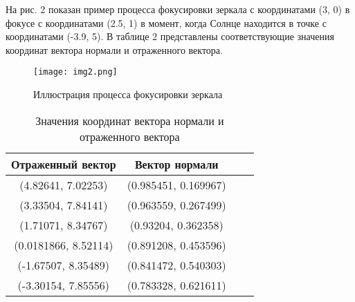 \documentclass{report}
\begin{document}
\begin{verbatim}
\end{verbatim}

На рис. 2 показан пример процесса фокусировки зеркала с координатами (3, 0) в фокусе с координатами (2.5, 1) в момент, когда Солнце находится в точке с координатами (-3.9, 5). В таблице 2 представлены соответствующие значения координат вектора нормали и отраженного вектора.

\begin{figure}[!htb]
     \centering
     \texttt{[image: img2.png]}
     \caption{Иллюстрация процесса фокусировки зеркала}\label{Fig:Data1}
\end{figure}

\begin{table}[h]
\centering
\begin{tabular}{ |c|c|c|c| }
 \hline
 {\bf Отраженный вектор} & {\bf Вектор нормали} \\ [0.5ex] 
 \hline
 (4.82641, 7.02253) & (0.985451, 0.169967) \\
 (3.33504, 7.84141) & (0.963559, 0.267499) \\
 (1.71071, 8.34767) & (0.93204, 0.362358) \\
 (0.0181866, 8.52114) & (0.891208, 0.453596) \\
 (-1.67507, 8.35489) & (0.841472, 0.540303) \\
 (-3.30154, 7.85556) & (0.783328, 0.621611) \\
 \hline
\end{tabular}
\captionsetup{justification=centering}
\caption{Значения координат вектора нормали и отраженного вектора}
\end{table}
\end{document}
